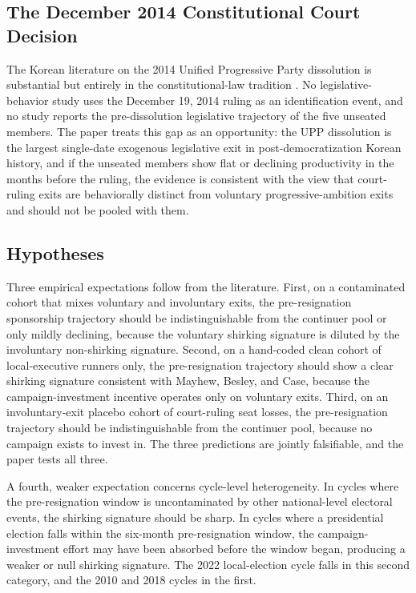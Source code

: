 \documentclass[11pt]{article}
\begin{document}
\subsection{The December 2014 Constitutional Court Decision}

The Korean literature on the 2014 Unified Progressive Party dissolution is substantial but entirely in the constitutional-law tradition \citep{kim2017, kwon2015}. No legislative-behavior study uses the December 19, 2014 ruling as an identification event, and no study reports the pre-dissolution legislative trajectory of the five unseated members. The paper treats this gap as an opportunity: the UPP dissolution is the largest single-date exogenous legislative exit in post-democratization Korean history, and if the unseated members show flat or declining productivity in the months before the ruling, the evidence is consistent with the view that court-ruling exits are behaviorally distinct from voluntary progressive-ambition exits and should not be pooled with them.

\subsection{Hypotheses}

Three empirical expectations follow from the literature. First, on a contaminated cohort that mixes voluntary and involuntary exits, the pre-resignation sponsorship trajectory should be indistinguishable from the continuer pool or only mildly declining, because the voluntary shirking signature is diluted by the involuntary non-shirking signature. Second, on a hand-coded clean cohort of local-executive runners only, the pre-resignation trajectory should show a clear shirking signature consistent with Mayhew, Besley, and Case, because the campaign-investment incentive operates only on voluntary exits. Third, on an involuntary-exit placebo cohort of court-ruling seat losses, the pre-resignation trajectory should be indistinguishable from the continuer pool, because no campaign exists to invest in. The three predictions are jointly falsifiable, and the paper tests all three.

A fourth, weaker expectation concerns cycle-level heterogeneity. In cycles where the pre-resignation window is uncontaminated by other national-level electoral events, the shirking signature should be sharp. In cycles where a presidential election falls within the six-month pre-resignation window, the campaign-investment effort may have been absorbed before the window began, producing a weaker or null shirking signature. The 2022 local-election cycle falls in this second category, and the 2010 and 2018 cycles in the first.
\end{document}
